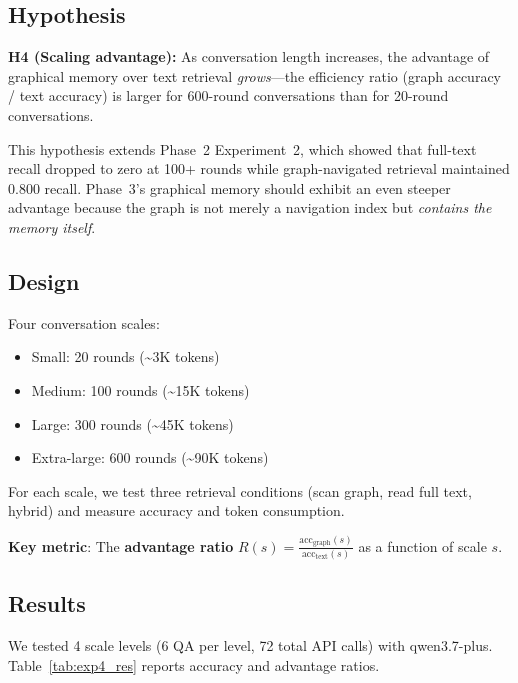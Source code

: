 \documentclass[11pt,a4paper]{article}
\begin{document}
\subsection{Hypothesis}

\textbf{H4 (Scaling advantage):} As conversation length increases, the advantage of graphical memory over text retrieval \textit{grows}---the efficiency ratio (graph accuracy / text accuracy) is larger for 600-round conversations than for 20-round conversations.

This hypothesis extends Phase~2 Experiment~2, which showed that full-text recall dropped to zero at 100+ rounds while graph-navigated retrieval maintained 0.800 recall. Phase~3's graphical memory should exhibit an even steeper advantage because the graph is not merely a navigation index but \textit{contains the memory itself}.

\subsection{Design}

Four conversation scales:
\begin{itemize}[nosep]
\item Small: 20 rounds (\textasciitilde 3K tokens)
\item Medium: 100 rounds (\textasciitilde 15K tokens)
\item Large: 300 rounds (\textasciitilde 45K tokens)
\item Extra-large: 600 rounds (\textasciitilde 90K tokens)
\end{itemize}

For each scale, we test three retrieval conditions (scan graph, read full text, hybrid) and measure accuracy and token consumption.

\textbf{Key metric}: The \textbf{advantage ratio} $R(s) = \frac{\text{acc}_{\text{graph}}(s)}{\text{acc}_{\text{text}}(s)}$ as a function of scale $s$.

\subsection{Results}

We tested 4 scale levels (6 QA per level, 72 total API calls) with qwen3.7-plus. Table~\ref{tab:exp4_res} reports accuracy and advantage ratios.
\end{document}

